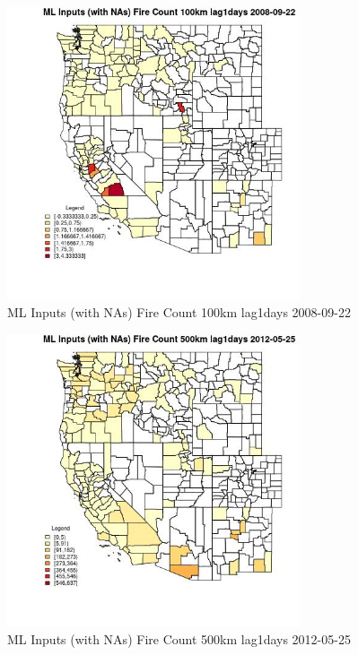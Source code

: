 \begin{figure} 
\centering  
\includegraphics[width=0.77\textwidth]{Code_Outputs/Report_ML_input_PM25_Step4_part_e_de_duplicated_aves_compiled_2019-05-18wNAs_CountyFire_Count_100km_lag1daysMean2008-09-22.jpg} 
\caption{\label{fig:Report_ML_input_PM25_Step4_part_e_de_duplicated_aves_compiled_2019-05-18wNAsCountyFire_Count_100km_lag1daysMean2008-09-22}ML Inputs (with NAs) Fire Count 100km lag1days 2008-09-22} 
\end{figure} 
 

\begin{figure} 
\centering  
\includegraphics[width=0.77\textwidth]{Code_Outputs/Report_ML_input_PM25_Step4_part_e_de_duplicated_aves_compiled_2019-05-18wNAs_CountyFire_Count_500km_lag1daysMean2012-05-25.jpg} 
\caption{\label{fig:Report_ML_input_PM25_Step4_part_e_de_duplicated_aves_compiled_2019-05-18wNAsCountyFire_Count_500km_lag1daysMean2012-05-25}ML Inputs (with NAs) Fire Count 500km lag1days 2012-05-25} 
\end{figure} 
 

